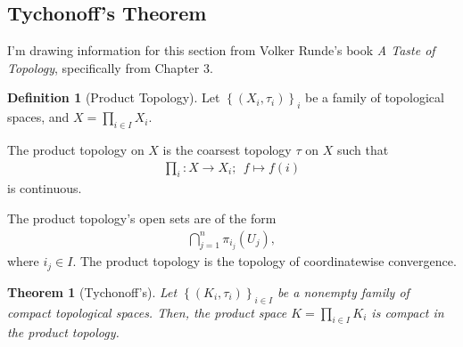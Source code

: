 \documentclass[10pt]{extarticle}
\newcommand{\set}[1]{\left\{#1\right\}}
\theoremstyle{plain}
\newtheorem*{theorem}{Theorem}
\theoremstyle{definition}
\newtheorem*{definition}{Definition}
\theoremstyle{note}
\renewcommand{\newline}{\hfill\break}
\begin{document}
\subsection{Tychonoff's Theorem}%
I'm drawing information for this section from Volker Runde's book \textit{A Taste of Topology}, specifically from Chapter 3.
\begin{definition}[Product Topology]
  Let $\set{\left(X_{i},\tau_{i}\right)}_{i}$ be a family of topological spaces, and $\displaystyle X = \prod_{i\in I}X_i$.\newline

  The product topology on $X$ is the coarsest topology $\tau$ on $X$ such that
  \begin{align*}
    \prod_{i}: X \rightarrow X_i;~~f\mapsto f(i)
  \end{align*}
  is continuous.
\end{definition}
The product topology's open sets are of the form
\begin{align*}
  \bigcap_{j=1}^{n}\pi_{i_j}\left(U_j\right),
\end{align*}
where $i_{j}\in I$. The product topology is the topology of coordinatewise convergence.
\begin{theorem}[Tychonoff's]
  Let $\set{\left(K_i,\tau_i\right)}_{i\in I}$ be a nonempty family of compact topological spaces. Then, the product space $\displaystyle K = \prod_{i\in I}K_i$ is compact in the product topology.
\end{theorem}
\end{document}
